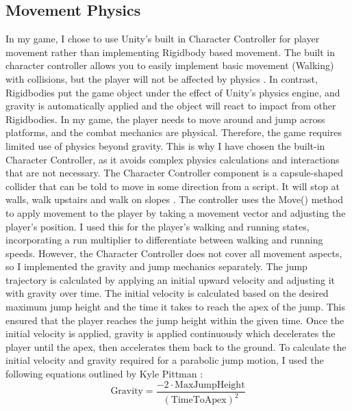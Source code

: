 \documentclass[]{final_report}
\begin{document}
\subsection{Movement Physics}\label{physics}
In my game, I chose to use Unity's built in Character Controller for player movement rather than implementing Rigidbody based movement. The built in character controller allows you to easily implement basic movement (Walking) with collisions, but the player will not be affected by physics \cite{unity2024_charactercontroller}. In contrast, Rigidbodies put the game object under the effect of Unity's physics engine, and gravity is automatically applied and the object will react to impact from other Rigidbodies. In my game, the player needs to move around and jump across platforms, and the combat mechanics are physical. Therefore, the game requires limited use of physics beyond gravity.  This is why I have chosen the built-in Character Controller, as it avoids complex physics calculations and interactions that are not necessary. \newline
The Character Controller component is a capsule-shaped collider that can be told to move in some direction from a script. It will stop at walls, walk upstairs and walk on slopes \cite{unity2024_charactercontroller_reference}. The controller uses the Move() method to apply movement to the player by taking a movement vector and adjusting the player's position. I used this for the player's walking and running states, incorporating a run multiplier to differentiate between walking and running speeds. However, the Character Controller does not cover all movement aspects, so I implemented the gravity and jump mechanics separately.  \newline
The jump trajectory is calculated by applying an initial upward velocity and adjusting it with gravity over time. The initial velocity is calculated based on the desired maximum jump height and the time it takes to reach the apex of the jump. This ensured that the player reaches the jump height within the given time. Once the initial velocity is applied, gravity is applied continuously which decelerates the player until the apex, then accelerates them back to the ground. To calculate the initial velocity and gravity required for a parabolic jump motion, I used the following equations outlined by Kyle Pittman \cite{pittman2016_jump}:
\begin{equation}
\text{Gravity} = \frac{-2 \cdot \text{MaxJumpHeight}}{(\text{TimeToApex})^2}
\end{equation}
\end{document}
